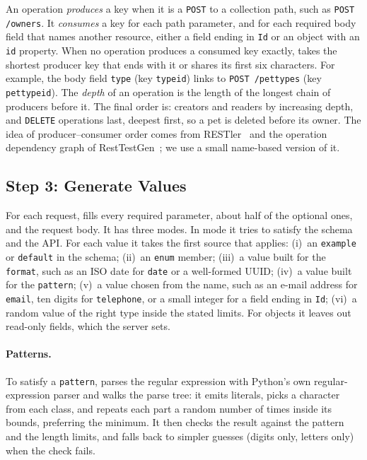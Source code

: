 An operation \emph{produces} a key when it is a \texttt{POST} to a collection
path, such as \texttt{POST /owners}. It \emph{consumes} a key for each path
parameter, and for each required body field that names another resource,
either a field ending in \texttt{Id} or an object with an \texttt{id}
property. When no operation produces a consumed key exactly, \tool takes the
shortest producer key that ends with it or shares its first six characters.
For example, the body field \texttt{type} (key \texttt{typeid}) links to
\texttt{POST /pettypes} (key \texttt{pettypeid}). The \emph{depth} of an operation is the length of the
longest chain of producers before it. The final order is: creators and
readers by increasing depth, and \texttt{DELETE} operations last, deepest
first, so a pet is deleted before its owner. The idea of producer--consumer
order comes from RESTler~\cite{restler} and the operation dependency graph of
RestTestGen~\cite{resttestgen}; we use a small name-based version of it.

\subsection{Step 3: Generate Values}
\label{sec:step3}
For each request, \tool fills every required parameter, about half of the
optional ones, and the request body. It has three modes. In 
mode it tries to satisfy the schema and the API. For each value it takes the
first source that applies:
(i)~an \texttt{example} or \texttt{default} in the schema;
(ii)~an \texttt{enum} member;
(iii)~a value built for the \texttt{format}, such as an ISO date for
\texttt{date} or a well-formed UUID;
(iv)~a value built for the \texttt{pattern};
(v)~a value chosen from the name, such as an e-mail address for
\texttt{email}, ten digits for \texttt{telephone}, or a small integer for a
field ending in \texttt{Id};
(vi)~a random value of the right type inside the stated limits.
For objects it leaves out read-only fields, which the server sets.

\paragraph{Patterns.} To satisfy a \texttt{pattern}, \tool parses the regular
expression with Python's own regular-expression parser and walks the parse
tree: it emits literals, picks a character from each class, and repeats each
part a random number of times inside its bounds, preferring the minimum. It
then checks the result against the pattern and the length limits, and falls
back to simpler guesses (digits only, letters only) when the check fails.

